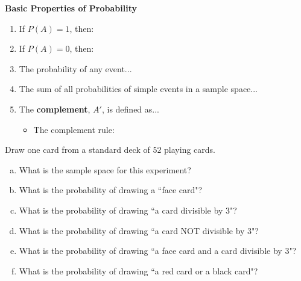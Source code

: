 \documentclass[12pt, letterpaper]{article}
\newcounter{exercise}
\theoremstyle{definition}
\begin{document}
\vfill


\newpage


\begin{statement}
\textbf{Basic Properties of Probability}

\begin{enumerate}

\item If $P(A)=1$, then:
\vspace*{.3in}

\item If $P(A)=0$, then:
\vspace*{.3in}

\item The probability of any event...
\vspace*{.3in}

\item The sum of all probabilities of simple events in a sample space...
\vspace*{.3in}

\item The \textbf{complement}, $A'$, is defined as...
\vspace{.3in}

\begin{itemize}
\item The complement rule:
\vspace*{.3in}
\end{itemize}

\end{enumerate}

\end{statement}



\begin{exercise}
Draw one card from a standard deck of $52$ playing cards.
\end{exercise}
\begin{enumerate}[(a)]
\item What is the sample space for this experiment?
\vfill
\item What is the probability of drawing a ``face card"?
\vfill
\item What is the probability of drawing ``a card divisible by $3$"?
\vfill
\item What is the probability of drawing ``a card NOT divisible by $3$"?
\vfill
\item What is the probability of drawing ``a face card and a card divisible by $3$"?
\vfill
\item What is the probability of drawing ``a red card or a black card"?
\vfill
\end{enumerate}
\end{document}
